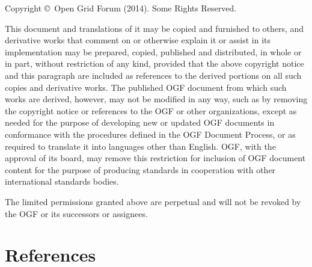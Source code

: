 \documentclass{article}
\newcommand{\copyrightyears}{2014}
\begin{document}
 Copyright \copyright \ Open Grid Forum (\copyrightyears). Some Rights
 Reserved.

 This document and translations of it may be copied and furnished to
 others, and derivative works that comment on or otherwise explain it
 or assist in its implementation may be prepared, copied, published
 and distributed, in whole or in part, without restriction of any
 kind, provided that the above copyright notice and this paragraph are
 included as references to the derived portions on all such copies and
 derivative works. The published OGF document from which such works
 are derived, however, may not be modified in any way, such as by
 removing the copyright notice or references to the OGF or other
 organizations, except as needed for the purpose of developing new or
 updated OGF documents in conformance with the procedures defined in
 the OGF Document Process, or as required to translate it into
 languages other than English. OGF, with the approval of its board,
 may remove this restriction for inclusion of OGF document content for
 the purpose of producing standards in cooperation with other
 international standards bodies. 

 The limited permissions granted above are perpetual and will not be
 revoked by the OGF or its successors or assignees. 


\section{References}
\renewcommand{\refname}{}
\vspace*{-3em}

\end{document}
